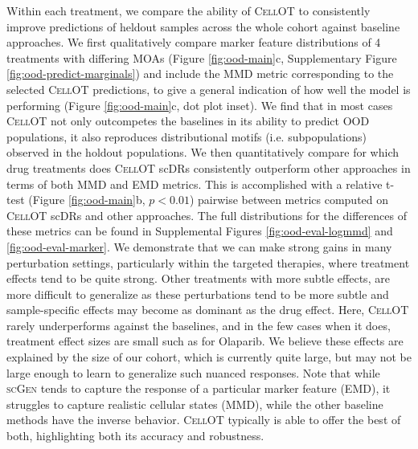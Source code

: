 Within each treatment, we compare the ability of \textsc{CellOT} to consistently improve predictions of heldout samples across the whole cohort against baseline approaches.
We first qualitatively compare marker feature distributions of 4 treatments with differing MOAs (Figure \ref{fig:ood-main}c, Supplementary Figure \ref{fig:ood-predict-marginals}) and include the MMD metric corresponding to the selected \textsc{CellOT} predictions, to give a general indication of how well the model is performing (Figure \ref{fig:ood-main}c, dot plot inset).
We find that in most cases \textsc{CellOT} not only outcompetes the baselines in its ability to predict OOD populations, it also reproduces distributional motifs (i.e. subpopulations) observed in the holdout populations.
We then quantitatively compare for which drug treatments does \textsc{CellOT} scDRs consistently outperform other approaches in terms of both MMD and EMD metrics.
This is accomplished with a relative t-test (Figure \ref{fig:ood-main}b, $p < 0.01$) pairwise between metrics computed on \textsc{CellOT} scDRs and other approaches.
The full distributions for the differences of these metrics can be found in Supplemental Figures \ref{fig:ood-eval-logmmd} and \ref{fig:ood-eval-marker}.
We demonstrate that we can make strong gains in many perturbation settings, particularly within the targeted therapies, where treatment effects tend to be quite strong.
Other treatments with more subtle effects, are more difficult to generalize as these perturbations tend to be more subtle and sample-specific effects may become as dominant as the drug effect.
Here, \textsc{CellOT} rarely underperforms against the baselines, and in the few cases when it does, treatment effect sizes are small such as for Olaparib.
We believe these effects are explained by the size of our cohort, which is currently quite large, but may not be large enough to learn to generalize such nuanced responses.
Note that while \textsc{scGen} tends to capture the response of a particular marker feature (EMD), it struggles to capture realistic cellular states (MMD), while the other baseline methods have the inverse behavior.
\textsc{CellOT} typically is able to offer the best of both, highlighting both its accuracy and robustness.

